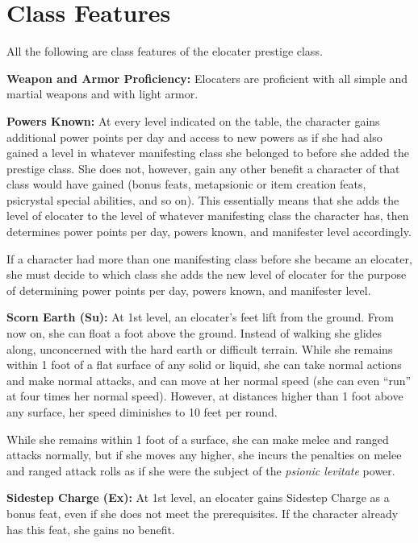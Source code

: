\documentclass{article}
\begin{document}
\vspace{12pt}
\section*{\textbf{Class Features}}

All the following are class features of the elocater prestige class.

\textbf{Weapon and Armor Proficiency:} Elocaters are proficient with all simple 
and martial weapons and with light armor.

\textbf{Powers Known:} At every level indicated on the table, the character gains 
additional power points per day and access to new powers as if she had also gained 
a level in whatever manifesting class she belonged to before she added the prestige 
class. She does not, however, gain any other benefit a character of that class 
would have gained (bonus feats, metapsionic or item creation feats, psicrystal 
special abilities, and so on). This essentially means that she adds the level of 
elocater to the level of whatever manifesting class the character has, then determines 
power points per day, powers known, and manifester level accordingly.

If a character had more than one manifesting class before she became an elocater, 
she must decide to which class she adds the new level of elocater for the purpose 
of determining power points per day, powers known, and manifester level.

\textbf{Scorn Earth (Su):} At 1st level, an elocater's feet lift from the ground. 
From now on, she can float a foot above the ground. Instead of walking she glides 
along, unconcerned with the hard earth or difficult terrain. While she remains 
within 1 foot of a flat surface of any solid or liquid, she can take normal actions 
and make normal attacks, and can move at her normal speed (she can even ``run'' 
at four times her normal speed). However, at distances higher than 1 foot above 
any surface, her speed diminishes to 10 feet per round.

While she remains within 1 foot of a surface, she can make melee and ranged attacks 
normally, but if she moves any higher, she incurs the penalties on melee and ranged 
attack rolls as if she were the subject of the \textit{psionic levitate }power.

\textbf{Sidestep Charge (Ex): }At 1st level, an elocater gains Sidestep Charge 
as a bonus feat, even if she does not meet the prerequisites. If the character 
already has this feat, she gains no benefit.
\end{document}
